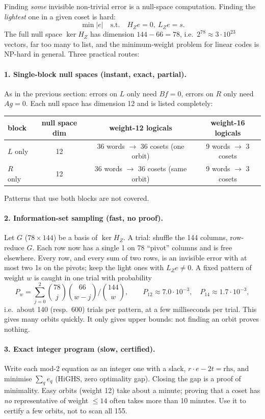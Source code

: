\documentclass[11pt]{article}
\begin{document}
Finding \emph{some} invisible non-trivial error is a null-space computation. Finding the
\emph{lightest} one in a given coset is hard:
\[
  \min |e| \quad\text{s.t.}\quad H_Z e = 0,\ L_Z e = s .
\]
The full null space $\ker H_Z$ has dimension $144-66 = 78$, i.e.\ $2^{78}\approx
3\cdot 10^{23}$ vectors, far too many to list, and the minimum-weight problem for linear codes
is NP-hard in general. Three practical routes:

\paragraph{1. Single-block null spaces (instant, exact, partial).}
As in the previous section: errors on $L$ only need $Bf=0$, errors on $R$ only need $Ag=0$.
Each null space has dimension 12 and is listed completely:

\begin{center}
\begin{tabular}{lccc}
\toprule
block & null space dim & weight-12 logicals & weight-16 logicals \\
\midrule
$L$ only & 12 & 36 words $\to$ 36 cosets (one orbit) & 9 words $\to$ 3 cosets \\
$R$ only & 12 & 36 words $\to$ 36 cosets (same orbit) & 9 words $\to$ 3 cosets \\
\bottomrule
\end{tabular}
\end{center}
Patterns that use both blocks are not covered.

\paragraph{2. Information-set sampling (fast, no proof).}
Let $G$ ($78\times 144$) be a basis of $\ker H_Z$. A trial: shuffle the 144 columns, row-reduce
$G$. Each row now has a single 1 on 78 ``pivot'' columns and is free elsewhere. Every row, and
every sum of two rows, is an invisible error with at most two 1s on the pivots; keep the light
ones with $L_Z e\ne 0$. A fixed pattern of weight $w$ is caught in one trial with probability
\[
  P_w = \sum_{j=0}^{2}\binom{78}{j}\binom{66}{w-j}\Big/\binom{144}{w},
  \qquad P_{12}\approx 7.0\cdot 10^{-3},\quad P_{14}\approx 1.7\cdot 10^{-3},
\]
i.e.\ about 140 (resp.\ 600) trials per pattern, at a few milliseconds per trial. This gives
many orbits quickly. It only gives upper bounds: not finding an orbit proves nothing.

\paragraph{3. Exact integer program (slow, certified).}
Write each mod-2 equation as an integer one with a slack, $r\cdot e - 2t = \text{rhs}$, and
minimise $\sum_q e_q$ (HiGHS, zero optimality gap). Closing the gap is a proof of minimality.
Easy orbits (weight 12) take about a minute; proving that a coset has \emph{no}
representative of weight $\le 14$ often takes more than 10 minutes. Use it to certify a
few orbits, not to scan all 155.
\end{document}
